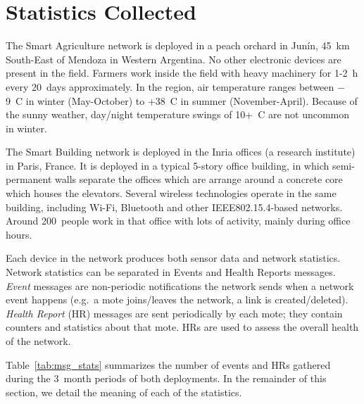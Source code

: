 \documentclass{elsarticle}
\newcommand{\building}            {Smart Building\xspace}
\newcommand{\agri}                {Smart Agriculture\xspace}
\begin{document}
\section{Statistics Collected}
\label{sec:collected}


The \agri network is deployed in a peach orchard in Jun\'in, 45~km South-East of Mendoza in Western Argentina.
No other electronic devices are present in the field.
Farmers work inside the field with heavy machinery for 1-2~h every 20~days approximately.
In the region, air temperature ranges between $-$9~C in winter (May-October) to +38~C in summer (November-April).
Because of the sunny weather, day/night temperature swings of 10+~C are not uncommon in winter.

The \building network is deployed in the Inria offices (a research institute) in Paris, France.
It is deployed in a typical 5-story office building, in which semi-permanent walls separate the offices which are arrange around a concrete core which houses the elevators.
Several wireless technologies operate in the same building, including Wi-Fi, Bluetooth and other IEEE802.15.4-based networks.
Around 200~people work in that office with lots of activity, mainly during office hours.


Each device in the network produces both sensor data and network statistics.
Network statistics can be separated in Events and Health Reports messages.
\textit{Event} messages are non-periodic notifications the network sends when a network event happens (e.g.~a mote joins/leaves the network, a link is created/deleted).
\textit{Health Report} (HR) messages are sent periodically by each mote; they contain counters and statistics about that mote.
HRs are used to assess the overall health of the network.


Table~\ref{tab:msg_stats} summarizes the number of events and HRs gathered during the 3~month periods of both deployments.
In the remainder of this section, we detail the meaning of each of the statistics.
\end{document}
